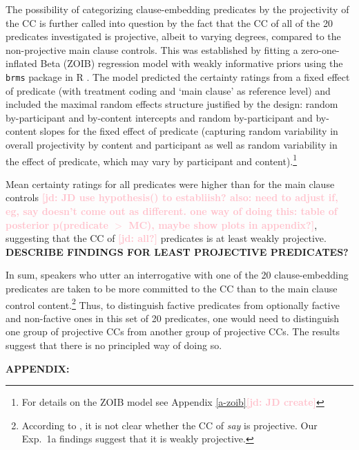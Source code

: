 \documentclass[11pt,fleqn]{article}
\newcommand{\jd}[1]{\textbf{\textcolor{Pink}{[jd: #1]}}}
\newcommand{\6}{\mbox{$[\hspace*{-.6mm}[$}}
\newcommand{\9}{\mbox{$]\hspace*{-.6mm}]$}}
\begin{document}
The possibility of categorizing clause-embedding predicates by the projectivity of the CC is further called into question by the fact that the CC of all of the 20 predicates investigated is projective, albeit to varying degrees, compared to the non-projective main clause controls. This was established by fitting a zero-one-inflated Beta (ZOIB) regression model \citep{liu2015} with weakly informative priors using the \verb|brms| \citep{buerkner2017}  package in R \citep{R}. The model predicted the certainty ratings from a fixed effect of predicate (with treatment coding and `main clause' as  reference level) and included the maximal random effects structure justified by the design: random by-participant and by-content intercepts and random by-participant and by-content slopes for the fixed effect of predicate (capturing random variability in overall projectivity by content and participant as well as random variability in the effect of predicate, which may vary by participant and content).\footnote{For details on the ZOIB model see Appendix \ref{a-zoib}\jd{JD create}} 

Mean certainty ratings for all predicates were higher than for the main clause controls \jd{JD use hypothesis() to establiish? also: need to adjust if, eg, say doesn't come out as different. one way of doing this: table of posterior p(predicate $>$ MC), maybe show plots in appendix?}, suggesting that the CC of \jd{all?} predicates is at least weakly projective.  {\bf DESCRIBE FINDINGS FOR LEAST PROJECTIVE PREDICATES?} 

In sum, speakers who utter an interrogative with one of the 20 clause-embedding predicates are taken to be more committed to the CC than to the main clause control content.\footnote{According to \citet[1739]{spector-egre2015}, it is not clear whether the CC of {\em say} is projective. Our Exp.~1a findings suggest that it is weakly projective.}    Thus, to distinguish factive predicates from optionally factive and non-factive ones in this set of 20 predicates, one would need to distinguish one group of projective CCs from another group of projective CCs. The results suggest that there is no principled way of doing so.


{\bf APPENDIX:} 
\end{document}
